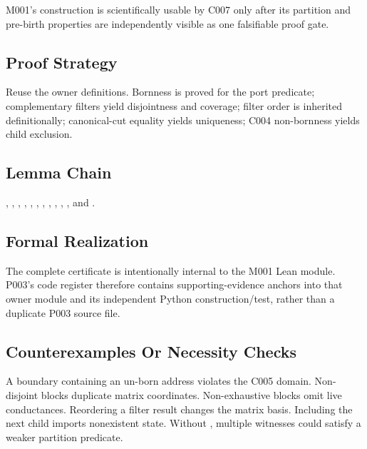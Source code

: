 M001's construction is scientifically usable by C007 only after its
partition and pre-birth properties are independently visible as one
falsifiable proof gate.

\subsection{Proof Strategy}\label{proof-strategy-5}

Reuse the owner definitions. Bornness is proved for the port predicate;
complementary filters yield disjointness and coverage; filter order is
inherited definitionally; canonical-cut equality yields uniqueness; C004
non-bornness yields child exclusion.

\subsection{Lemma Chain}\label{lemma-chain-5}

\texttt{\protect{}}, \texttt{\protect{}}, \texttt{\protect{}},
\texttt{\protect{}}, \texttt{\protect{}},
\texttt{\protect{}}, \texttt{\protect{}},
\texttt{\protect{}}, \texttt{\protect{}},
\texttt{\protect{}}, \texttt{\protect{}}, and
\texttt{\protect{}}.

\subsection{Formal Realization}\label{formal-realization-5}

The complete certificate is intentionally internal to the M001 Lean
module. P003's code register therefore contains supporting-evidence
anchors into that owner module and its independent Python
construction/test, rather than a duplicate P003 source file.

\subsection{Counterexamples Or Necessity
Checks}\label{counterexamples-or-necessity-checks-5}

A boundary containing an un-born address violates the C005 domain.
Non-disjoint blocks duplicate matrix coordinates. Non-exhaustive blocks
omit live conductances. Reordering a filter result changes the matrix
basis. Including the next child imports nonexistent state. Without
\texttt{\protect{}}, multiple witnesses could satisfy a weaker
partition predicate.

